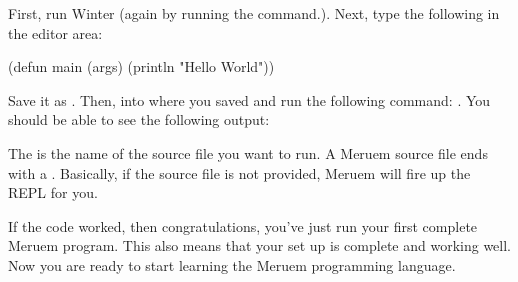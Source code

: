 First, run Winter (again by running the  command.). Next, type the following in the editor area:

\begin{Meruem}
(defun main (args) (println "Hello World"))
\end{Meruem}

Save it as . Then,  into where you saved  and run the following command: . You should be able to see the following output:


The  is the name of the source file you want to run. A Meruem source file ends with a . Basically, if the source file is not provided, Meruem will fire up the REPL for you. 

If the code worked, then congratulations, you've just run your first complete Meruem program. This also means that your set up is complete and working well. Now you are ready to start learning the Meruem programming language.
